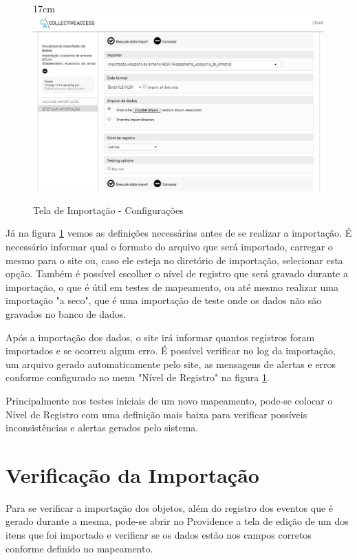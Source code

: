 \documentclass[a4paper,12pt,oneside,onecolumn,final,fleqn]{repUERJ}
\begin{document}
\begin{figure}[!ht]{17cm}
	\includegraphics[width=15cm, left]{figuras/tela_imp.jpg}
	\caption{Tela de Importação - Configurações} \label{fig:import}
\end{figure}

Já na figura \ref{fig:import} vemos as definições necessárias antes de se realizar a importação. É necessário informar qual o formato do arquivo que será importado, carregar o mesmo para o site ou, caso ele esteja no diretório de importação, selecionar esta opção. Também é possível escolher o nível de registro que será gravado durante a importação, o que é útil em testes de mapeamento, ou até mesmo realizar uma importação "a seco", que é uma importação de teste onde os dados não são gravados no banco de dados.

Após a importação dos dados, o site irá informar quantos registros foram importados e se ocorreu algum erro. É possível verificar no log da importação, um arquivo gerado automaticamente pelo site, as mensagens de alertas e erros conforme configurado no menu "Nível de Registro" na figura \ref{fig:import}. 

Principalmente nos testes iniciais de um novo mapeamento, pode-se colocar o Nível de Registro com uma definição mais baixa para verificar possíveis inconsistências e alertas gerados pelo sistema. 

\section{Verificação da Importação}

Para se verificar a importação dos objetos, além do registro dos eventos que é gerado durante a mesma, pode-se abrir no Providence a tela de edição de um dos itens que foi importado e verificar se os dados estão nos campos corretos conforme definido no mapeamento.
\end{document}
